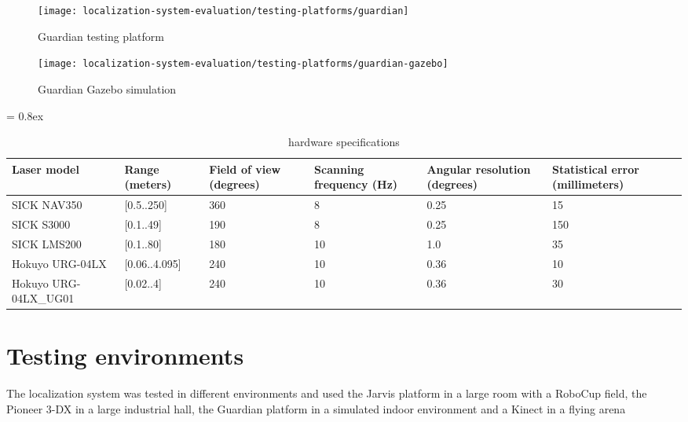 \begin{figure}[H]
	\centering
	\begin{minipage}[h]{0.497\textwidth}
		\centering
		\texttt{[image: localization-system-evaluation/testing-platforms/guardian]}
		\caption{Guardian testing platform}
		\label{fig:localization-system-evaluation_guardian}
	\end{minipage}\hfill
	\begin{minipage}[h]{0.497\textwidth}
		\centering
		\texttt{[image: localization-system-evaluation/testing-platforms/guardian-gazebo]}
		\caption{Guardian Gazebo simulation}
		\label{fig:localization-system-evaluation_guardian_gazebo}
	\end{minipage}
\end{figure}


\begin{table}[H]
	\caption{ hardware specifications}
	\tabulinesep = 0.8ex
	\centering
	\small
	\begin{tabu} { X[2.5,m,c] | X[m,c] X[m,c] X[m,c] X[m,c] X[m,c] }
		\rowfont{\bfseries\itshape} Laser model & Range (meters) & Field of view (degrees) & Scanning frequency (Hz) & Angular resolution (degrees) & Statistical error (millimeters) \\
		\hline
		{\small SICK NAV350} 			& [0.5..250] 	& 360 	& 8 	& 0.25 	& 15 	\\
		{\small SICK S3000} 			& [0.1..49] 	& 190 	& 8 	& 0.25 	& 150 	\\
		{\small SICK LMS200} 			& [0.1..80] 	& 180 	& 10 	& 1.0 	& 35 	\\
		{\small Hokuyo URG-04LX} 		& [0.06..4.095] & 240 	& 10 	& 0.36 	& 10 	\\
		{\small Hokuyo URG-04LX\_UG01} 	& [0.02..4] 	& 240 	& 10 	& 0.36 	& 30 	\\
	\end{tabu}
	\label{tab:localization-system-evaluation_laser-hardware-specifications}
\end{table}


\section{Testing environments}

The localization system was tested in different environments and used the Jarvis platform in a large room with a RoboCup field, the Pioneer 3-DX in a large industrial hall, the Guardian platform in a simulated indoor environment and a Kinect in a flying arena



